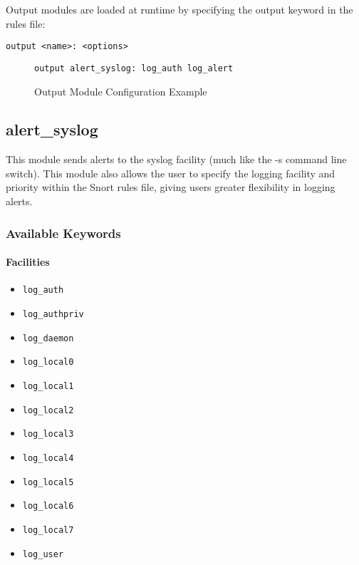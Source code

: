\documentclass[english]{report}
\begin{document}
Output modules are loaded at runtime by specifying the output keyword
in the rules file:

\begin{verbatim}
output <name>: <options>
\end{verbatim}

\begin{figure}[!hbpt]
\begin{verbatim}
output alert_syslog: log_auth log_alert
\end{verbatim}

\caption{\label{output config example}Output Module Configuration Example}
\end{figure}

\subsection{alert\_syslog \label{alert syslog lable}}

This module sends alerts to the syslog facility (much like the -s
command line switch). This module also allows the user to specify
the logging facility and priority within the Snort rules file, giving
users greater flexibility in logging alerts.

\subsubsection{Available Keywords}


\paragraph{Facilities}

\begin{itemize}
\item \texttt{log\_auth} 
\item \texttt{log\_authpriv} 
\item \texttt{log\_daemon}
\item \texttt{log\_local0} 
\item \texttt{log\_local1}
\item \texttt{log\_local2}
\item \texttt{log\_local3}
\item \texttt{log\_local4}
\item \texttt{log\_local5}
\item \texttt{log\_local6}
\item \texttt{log\_local7}
\item \texttt{log\_user}
\end{itemize}
\end{document}

